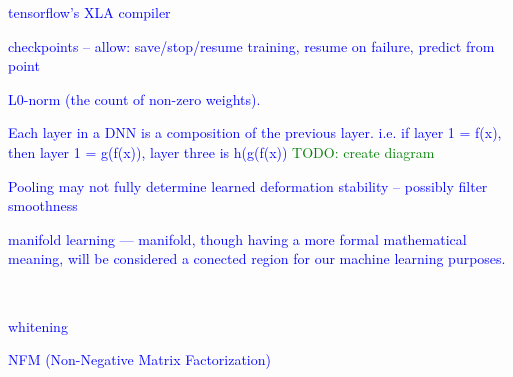 

\textcolor{blue}{tensorflow's XLA compiler}

\textcolor{blue}{checkpoints -- allow: save/stop/resume training, resume on failure, predict from point}







\textcolor{blue}{L0-norm (the count of non-zero weights).}




\textcolor{blue}{Each layer in a DNN is a composition of the previous layer. i.e. if layer 1 = f(x), then layer 1 = g(f(x)), layer three is h(g(f(x)) \textcolor{green}{TODO: create diagram}}





\textcolor{blue}{Pooling may not fully determine learned deformation stability -- possibly filter smoothness\cite{ruderman2018learned}}

\textcolor{blue}{manifold learning --- {manifold}, though having a more formal mathematical meaning, will be considered a conected region for our machine learning purposes.}

\

\textcolor{blue}{whitening}

\textcolor{blue}{NFM (Non-Negative Matrix Factorization)}

